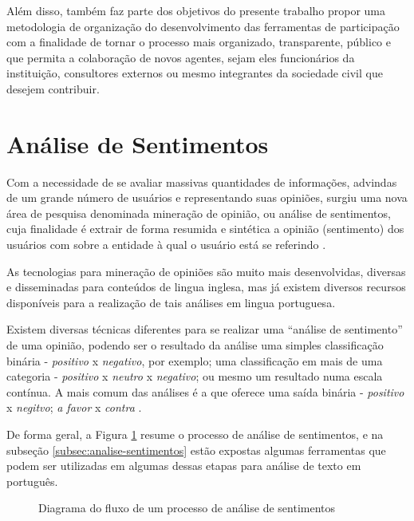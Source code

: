 Além disso, também faz parte dos objetivos do presente trabalho propor uma metodologia de organização do desenvolvimento das ferramentas de participação com a finalidade de tornar o processo mais organizado, transparente, público e que permita a colaboração de novos agentes, sejam eles funcionários da instituição, consultores externos ou mesmo integrantes da sociedade civil que desejem contribuir.

\section{Análise de Sentimentos}
Com a necessidade de se avaliar massivas quantidades de informações, advindas de um grande número de usuários e representando suas opiniões, surgiu uma nova área de pesquisa denominada mineração de opinião, ou análise de sentimentos, cuja finalidade é extrair de forma resumida e sintética a opinião (sentimento) dos usuários com sobre a entidade à qual o usuário está se referindo  .

As tecnologias para mineração de opiniões são muito mais desenvolvidas, diversas e disseminadas para conteúdos de lingua inglesa, mas já existem diversos recursos disponíveis para a realização de tais análises em lingua portuguesa.

Existem diversas técnicas diferentes para se realizar uma ``análise de sentimento'' de uma opinião, podendo ser o resultado da análise uma simples classificação binária - \textit{positivo} x \textit{negativo}, por exemplo; uma classificação em mais de uma categoria - \textit{positivo} x \textit{neutro} x \textit{negativo}; ou mesmo um resultado numa escala contínua. A mais comum das análises é a que oferece uma saída binária - \textit{positivo} x \textit{negitvo}; \textit{a favor} x \textit{contra} \cite{Pang:2008:OMS:1454711.1454712}.

De forma geral, a Figura \ref{fig:fluxo-processo-as} resume o processo de análise de sentimentos, e na subseção \ref{subsec:analise-sentimentos} estão expostas algumas ferramentas que podem ser utilizadas em algumas dessas etapas para análise de texto em português.

    \begin{figure}[htb]%
        \caption{Diagrama do fluxo de um processo de análise de sentimentos\label{fig:fluxo-processo-as}}%
    \end{figure}%
    
